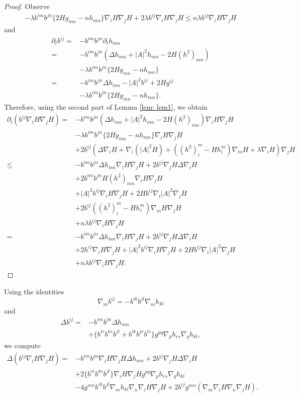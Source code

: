\documentclass{amsart}
\theoremstyle{definition}
\theoremstyle{remark}
\numberwithin{equation}{section}
\begin{document}
\begin{proof}
Observe
\begin{align*}
-\lambda b^{im}b^{jn}\{2Hg_{mn}-nh_{mn}\}\nabla_iH\nabla_jH+2\lambda b^{ij}\nabla_iH\nabla_jH\leq n\lambda b^{ij}\nabla_iH\nabla_jH
\end{align*}
and
\begin{align*}
\partial_t b^{ij}=&-b^{im}b^{jn}\partial_th_{mn}\\
=&-b^{im}b^{jn}(\Delta h_{mn}+|A|^2h_{mn}-2H(h^2)_{mn})\\
&-\lambda b^{im}b^{jn}\{2Hg_{mn}-nh_{mn}\}\\
=&-b^{im}b^{jn}\Delta h_{mn}-|A|^2b^{ij}+2Hg^{ij}\\
&-\lambda b^{im}b^{jn}\{2Hg_{mn}-nh_{mn}\}.
\end{align*}
Therefore, using the second part of Lemma \ref{lem: lem1}, we obtain
\begin{align*}
\partial_t( b^{ij}\nabla_iH\nabla_jH)=&-b^{im}b^{jn}(\Delta h_{mn}+|A|^2h_{mn}-2H(h^2)_{mn})\nabla_iH\nabla_jH\\
&-\lambda b^{im}b^{jn}\{2Hg_{mn}-nh_{mn}\}\nabla_iH\nabla_jH\\
&+2b^{ij}(\Delta\nabla_iH+\nabla_i(|A|^2H)+((h^2)_i^m-Hh_i^m)\nabla_mH+\lambda \nabla_iH)\nabla_jH\\
\leq& -b^{im}b^{jn}\Delta h_{mn}\nabla_iH\nabla_jH+2b^{ij}\nabla_jH\Delta\nabla_iH\\
&+2b^{im}b^{jn}H(h^2)_{mn}\nabla_iH\nabla_jH\\
&+|A|^2b^{ij}\nabla_iH\nabla_jH+2Hb^{ij}\nabla_i|A|^2\nabla_jH\\
&+2b^{ij}((h^2)_i^m-Hh_i^m)\nabla_mH\nabla_jH\\
&+n\lambda b^{ij}\nabla_iH\nabla_jH\\
=&-b^{im}b^{jn}\Delta h_{mn}\nabla_iH\nabla_jH+2b^{ij}\nabla_jH\Delta\nabla_iH\\
&+2h^{ij}\nabla_iH\nabla_jH
+|A|^2b^{ij}\nabla_iH\nabla_jH+2Hb^{ij}\nabla_i|A|^2\nabla_jH\\
&+n\lambda b^{ij}\nabla_iH\nabla_jH.
\end{align*}
\end{proof}
Using the identities
\[\nabla_mb^{ij}=-b^{ik}b^{jl}\nabla_mh_{kl}\]
and
\begin{align*}
\Delta b^{ij}=&-b^{im}b^{jn}\Delta h_{mn}\\
&+\{b^{ir}b^{ks}b^{jl}+b^{ik}b^{jr}b^{ls}\}g^{pq}\nabla_ph_{rs}\nabla_qh_{kl},
\end{align*}
we compute
\begin{align*}
\Delta( b^{ij}\nabla_iH\nabla_jH)=&-b^{im}b^{jn}\nabla_iH\nabla_jH\Delta h_{mn}+2b^{ij}\nabla_jH\Delta\nabla_iH\\\
&+2\{b^{ir}b^{ks}b^{jl}\}\nabla_iH\nabla_jHg^{pq}\nabla_ph_{rs}\nabla_qh_{kl}\\
&-4g^{mn}b^{ik}b^{jl}\nabla_mh_{kl}\nabla_n\nabla_iH\nabla_jH+2b^{ij}g^{mn}(\nabla_m\nabla_iH\nabla_n\nabla_jH).
\end{align*}
\end{document}
